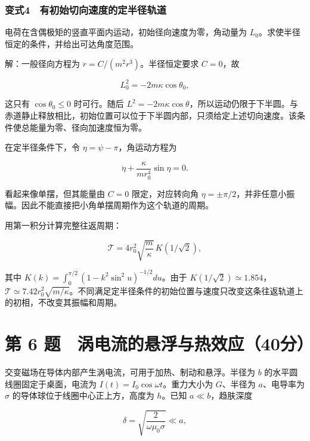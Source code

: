\documentclass[12pt,a4paper,fontset=fandol]{ctexart}
\begin{document}
\noindent\begin{minipage}{\linewidth}
\subsubsection{变式4　有初始切向速度的定半径轨道}\label{ux53d8ux5f0f4-ux6709ux521dux59cbux5207ux5411ux901fux5ea6ux7684ux5b9aux534aux5f84ux8f68ux9053}

电荷在含偶极矩的竖直平面内运动，初始径向速度为零，角动量为
\(L_0\)。求使半径恒定的条件，并给出可达角度范围。

解：一般径向方程为 \(\ddot r=C/(m^2r^3)\)。半径恒定要求 \(C=0\)，故

\[L_0^2=-2m\kappa\cos\theta_0,\]

这只有 \(\cos\theta_0\le0\) 时可行。随后
\(L^2=-2m\kappa\cos\theta\)，所以运动仍限于下半圆。与赤道静止释放相比，初始位置可以位于下半圆内部，只须给定上述切向速度。该条件使总能量为零、径向加速度恒为零。

在定半径条件下，令 \(\eta=\psi-\pi\)，角运动方程为

\[\ddot\eta+\frac{\kappa}{mr_0^4}\sin\eta=0.\]

看起来像单摆，但其能量由 \(C=0\) 限定，对应转向角
\(\eta=\pm\pi/2\)，并非任意小振幅。因此不能直接把小角单摆周期作为这个轨道的周期。

用第一积分计算完整往返周期：

\[\mathcal T=
4r_0^2\sqrt{\frac m\kappa}\,
K(1/\sqrt2),\]

其中 \(K(k)=\int_0^{\pi/2}(1-k^2\sin^2u)^{-1/2}du\)。由于
\(K(1/\sqrt2)\simeq1.854\)，\(\mathcal T\simeq7.42r_0^2\sqrt{m/\kappa}\)。不同满足定半径条件的初始位置与速度只改变这条往返轨道上的初相，不改变其振幅和周期。


\end{minipage}

\clearpage

\section{第 6
题　涡电流的悬浮与热效应（40分）}\label{ux7b2c-6-ux9898-ux6da1ux7535ux6d41ux7684ux60acux6d6eux4e0eux70edux6548ux5e9440ux5206}

交变磁场在导体内部产生涡电流，可用于加热、制动和悬浮。半径为 \(b\)
的水平圆线圈固定于桌面，电流为 \(I(t)=I_0\cos\omega t\)。重力大小为
\(G\)、半径为 \(a\)、电导率为 \(\sigma\)
的导体球位于线圈中心正上方，高度为 \(h\)。已知 \(a\ll b\)，趋肤深度

\[\delta=\sqrt{\frac2{\omega\mu_0\sigma}}\ll a,\]
\end{document}
